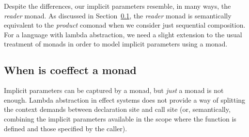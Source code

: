 \noindent
Despite the differences, our implicit parameters resemble, in many ways, the \emph{reader} monad.
As discussed in Section~\ref{sec:semantics-related-monads}, the \emph{reader} monad is semantically
equivalent to the \emph{product} comonad when we consider just sequential composition. For a
language with lambda abstraction, we need a slight extension to the usual treatment of monads in
order to model implicit parameters using a monad.


\subsection{When is coeffect a monad}
\label{sec:semantics-related-monads}

Implicit parameters can be captured by a monad, but \emph{just} a monad is not enough.
Lambda abstraction in effect systems does not provide a way of splitting the context
demands between declaration site and call site (or, semantically, combining the implicit
parameters available in the scope where the function is defined and those specified by the caller).


